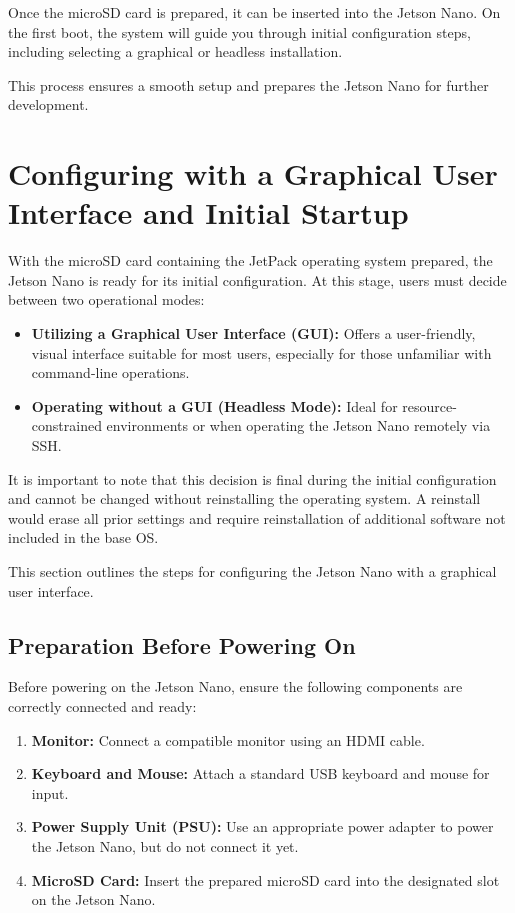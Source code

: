 Once the microSD card is prepared, it can be inserted into the Jetson Nano. On the first boot, the system will guide you through initial configuration steps, including selecting a graphical or headless installation.

This process ensures a smooth setup and prepares the Jetson Nano for further development.




\section{Configuring with a Graphical User Interface and Initial Startup}

With the microSD card containing the JetPack operating system prepared, the Jetson Nano is ready for its initial configuration. At this stage, users must decide between two operational modes:

\begin{itemize}
	\item \textbf{Utilizing a Graphical User Interface (GUI):} Offers a user-friendly, visual interface suitable for most users, especially for those unfamiliar with command-line operations.
	\item \textbf{Operating without a GUI (Headless Mode):} Ideal for resource-constrained environments or when operating the Jetson Nano remotely via SSH.
\end{itemize}

\bigskip

It is important to note that this decision is final during the initial configuration and cannot be changed without reinstalling the operating system. A reinstall would erase all prior settings and require reinstallation of additional software not included in the base OS.

\bigskip

This section outlines the steps for configuring the Jetson Nano with a graphical user interface.

\subsection{Preparation Before Powering On}

Before powering on the Jetson Nano, ensure the following components are correctly connected and ready:

\begin{enumerate}
	\item \textbf{Monitor:} Connect a compatible monitor using an HDMI cable.
	\item \textbf{Keyboard and Mouse:} Attach a standard USB keyboard and mouse for input.
	\item \textbf{Power Supply Unit (PSU):} Use an appropriate power adapter to power the Jetson Nano, but do not connect it yet.
	\item \textbf{MicroSD Card:} Insert the prepared microSD card into the designated slot on the Jetson Nano.
\end{enumerate}

